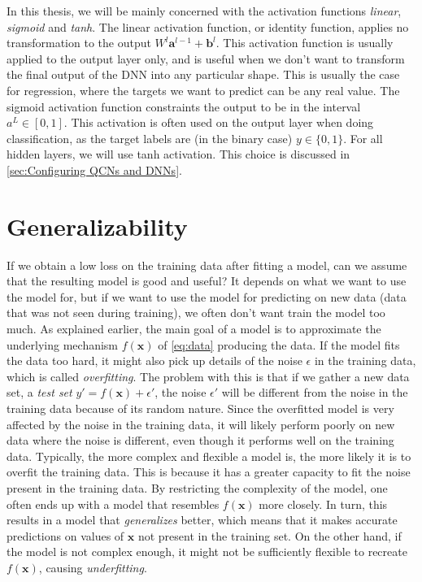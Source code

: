 In this thesis, we will be mainly concerned with the activation functions \emph{linear}, \emph{sigmoid} and \emph{tanh}. The linear activation function, or identity function, applies no transformation to the output $W^l \boldsymbol{a}^{l-1} + \boldsymbol{b}^l$. This activation function is usually applied to the output layer only, and is useful when we don't want to transform the final output of the DNN into any particular shape. This is usually the case for regression, where the targets we want to predict can be any real value. The sigmoid activation function constraints the output to be in the interval $a^L \in [0, 1]$. This activation is often used on the output layer when doing classification, as the target labels are (in the binary case) $y \in \{0,1\}$. For all hidden layers, we will use tanh activation. This choice is discussed in \cref{sec:Configuring QCNs and DNNs}.


\section{Generalizability}\label{sec:Generalizability}
If we obtain a low loss on the training data after fitting a model, can we assume that the resulting model is good and useful? It depends on what we want to use the model for, but if we want to use the model for predicting on new data (data that was not seen during training), we often don't want train the model too much. As explained earlier, the main goal of a model is to approximate the underlying mechanism $f(\boldsymbol{x})$ of \cref{eq:data} producing the data. If the model fits the data too hard, it might also pick up details of the noise $\epsilon$ in the training data, which is called \emph{overfitting}. The problem with this is that if we gather a new data set, a \emph{test set} $y' = f(\boldsymbol{x}) + \epsilon'$, the noise $\epsilon'$ will be different from the noise in the training data because of its random nature. Since the overfitted model is very affected by the noise in the training data, it will likely perform poorly on new data where the noise is different, even though it performs well on the training data. Typically, the more complex and flexible a model is, the more likely it is to overfit the training data. This is because it has a greater capacity to fit the noise present in the training data. By restricting the complexity of the model, one often ends up with a model that resembles $f(\boldsymbol{x})$ more closely. In turn, this results in a model
that \emph{generalizes} better, which means that it makes accurate predictions on values of $\boldsymbol{x}$ not present in the training set. On the other hand, if the model is not complex enough, it might not be sufficiently flexible to recreate $f(\boldsymbol{x})$, causing \emph{underfitting}.

